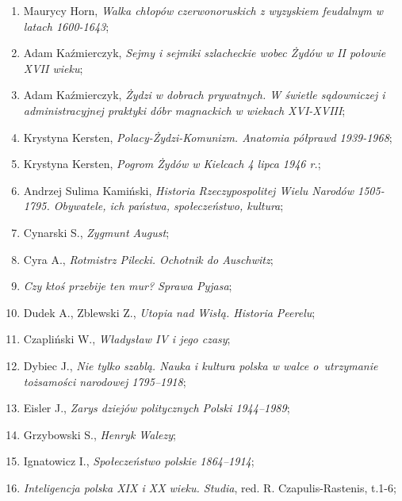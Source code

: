 \documentclass[a4paper,11pt]{article}
\begin{document}
\begin{enumerate}
\item Maurycy Horn, \textit{Walka chłopów czerwonoruskich z wyzyskiem
    feudalnym w latach 1600-1643};


\item Adam Kaźmierczyk, \textit{Sejmy i sejmiki szlacheckie wobec Żydów
    w II połowie XVII wieku};

\item Adam Kaźmierczyk, \textit{Żydzi w dobrach prywatnych. W świetle
    sądowniczej i administracyjnej praktyki dóbr magnackich w wiekach
    XVI-XVIII};

\item Krystyna Kersten, \textit{Polacy-Żydzi-Komunizm. Anatomia półprawd
    1939-1968};

\item Krystyna Kersten, \textit{Pogrom Żydów w Kielcach 4 lipca 1946
    r.};

\item Andrzej Sulima Kamiński, \textit{Historia Rzeczypospolitej Wielu
    Narodów 1505-1795. Obywatele, ich państwa, społeczeństwo,
    kultura};

\item Cynarski S., \textit{Zygmunt August};

\item Cyra A., \textit{Rotmistrz Pilecki. Ochotnik do Auschwitz};

\item \textit{Czy ktoś przebije ten mur? Sprawa Pyjasa};

\item Dudek A., Zblewski Z., \textit{Utopia nad Wisłą. Historia
    Peerelu};

\item Czapliński W., \textit{Władysław IV i jego czasy};

\item Dybiec J., \textit{Nie tylko szablą. Nauka i kultura polska w
    walce o~utrzymanie tożsamości narodowej 1795--1918};

\item Eisler J., \textit{Zarys dziejów politycznych Polski 1944--1989};

\item Grzybowski S., \textit{Henryk Walezy};

\item Ignatowicz I., \textit{Społeczeństwo polskie 1864--1914};

\item \textit{Inteligencja polska XIX i XX wieku. Studia}, red. R.
  Czapulis-Rastenis, t.1-6;


\end{enumerate}
\end{document}
